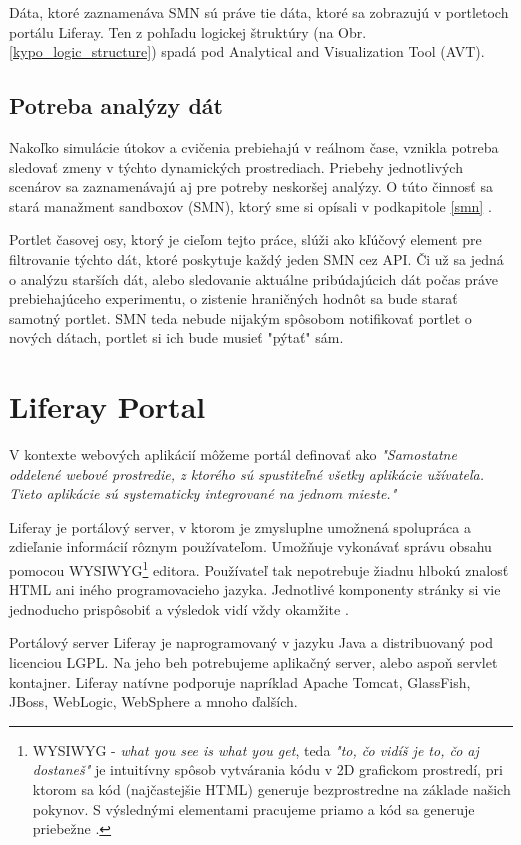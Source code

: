 \documentclass[
  digital, %
  twoside, %
  notable,   %
  nolof,   %
  nolot,   %
]{fithesis3}
\newcommand{\inquotes}[1]{{}"{}#1{}"{}}
\begin{document}
Dáta, ktoré zaznamenáva SMN sú práve tie dáta, ktoré sa zobrazujú v portletoch portálu Liferay. Ten z pohľadu logickej štruktúry (na Obr. \ref{kypo_logic_structure}) spadá pod Analytical and Visualization Tool (AVT).

\section{Potreba analýzy dát}
Nakoľko simulácie útokov a cvičenia prebiehajú v reálnom čase, vznikla potreba sledovať zmeny v týchto dynamických prostrediach. Priebehy jednotlivých scenárov sa zaznamenávajú aj pre potreby neskoršej analýzy. O túto činnosť sa stará manažment sandboxov (SMN), ktorý sme si opísali v podkapitole \ref{smn} .

Portlet časovej osy, ktorý je cieľom tejto práce, slúži ako kľúčový element pre filtrovanie týchto dát, ktoré poskytuje každý jeden SMN cez API. Či už sa jedná o analýzu starších dát, alebo sledovanie aktuálne pribúdajúcich dát počas práve prebiehajúceho experimentu, o zistenie hraničných hodnôt sa bude starať samotný portlet. SMN teda nebude nijakým spôsobom notifikovať portlet o nových dátach, portlet si ich bude musieť \inquotes{pýtať} sám.

\chapter{Liferay Portal}
\label{liferay}
V kontexte webových aplikácií môžeme portál definovať \cite{sezov2011liferay} ako \textit{"Samostatne oddelené webové prostredie, z ktorého sú spustiteľné všetky aplikácie užívateľa. Tieto aplikácie sú systematicky integrované na jednom mieste."}

Liferay je portálový server, v ktorom je zmysluplne umožnená spolupráca a zdieľanie informácií rôznym používateľom. Umožňuje vykonávať správu obsahu pomocou WYSIWYG\footnote{WYSIWYG - \textit{what you see is what you get}, teda \textit{"to, čo vidíš je to, čo aj dostaneš"} je intuitívny spôsob vytvárania kódu v 2D grafickom prostredí, pri ktorom sa kód (najčastejšie HTML) generuje bezprostredne na základe našich pokynov. S výslednými elementami pracujeme priamo a kód sa generuje priebežne \cite{guo2011wysiwyg}.} editora. Používateľ tak nepotrebuje žiadnu hlbokú znalosť HTML ani iného programovacieho jazyka. Jednotlivé komponenty stránky si vie jednoducho prispôsobiť a výsledok vidí vždy okamžite \cite{sezov2011liferay}.

Portálový server Liferay je naprogramovaný v jazyku Java a distribuovaný pod licenciou LGPL. Na jeho beh potrebujeme aplikačný server, alebo aspoň servlet kontajner. Liferay natívne podporuje napríklad Apache Tomcat, GlassFish, JBoss, WebLogic, WebSphere a mnoho ďalších.
\end{document}
